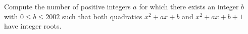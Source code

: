 Compute the number of positive integers $a$ for which there exists an integer $b$ with $0\le b\le2002$ such that both quadratics $x^2+ax+b$ and $x^2+ax+b+1$ have integer roots.
